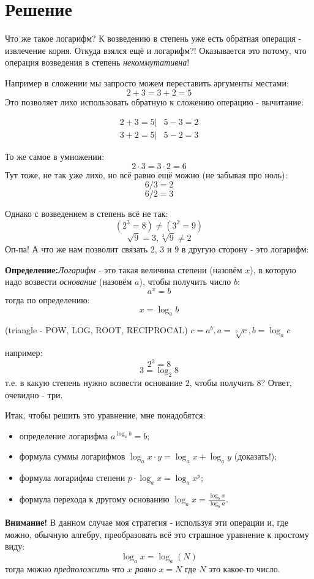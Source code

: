 \documentclass{article}
\begin{document}
\section{Решение}
Что же такое логарифм? К возведению в степень уже есть обратная операция - извлечение корня. Откуда взялся ещё и логарифм?! Оказывается это потому, что операция возведения в степень \textit{некоммутативна}!

Например в сложении мы запросто можем переставить аргументы местами:
$$2+3=3+2 = 5$$
Это позволяет лихо использовать обратную к сложению операцию - вычитание:


\begin{align*}
2+3=5 | & 5-3=2 \\
3+2=5 | & 5-2=3
\end{align*}

То же самое в умножении:
$$2\cdot{}3=3\cdot{}2=6$$
Тут тоже, не так уже лихо, но всё равно ещё можно (не забывая про ноль):
$$ 6/3=2 $$
$$ 6/2=3 $$

Однако с возведением в степень всё не так:
$$(2^3=8) \ne (3^2=9)$$
$$\sqrt{9}=3, \sqrt[3]{9} \ne 2$$
Оп-па! А что же нам позволит связать $2$, $3$ и $9$ в другую сторону - это логарифм:

\textbf{Определение:}\textit{Логарифм} - это такая величина степени (назовём $x$), в которую надо возвести \textit{основание} (назовём $a$), чтобы получить число $b$:
$$a^x=b$$
тогда по определению:
$$x=\log_{a}{b}$$

(triangle - POW, LOG, ROOT, RECIPROCAL)
$c=a^b, a=\sqrt[b]{c}, b=\log_a{c}$

например:
$$2^3=8$$
$$3=\log_{2}{8}$$
т.е. в какую степень нужно возвести основание $2$, чтобы получить $8$? Ответ, очевидно - три.

Итак, чтобы решить это уравнение, мне понадобятся:
\begin{itemize}
    \item определение логарифма $a^{\log_{a}{b}}=b$;
    \item формула суммы логарифмов $\log_{a}{x\cdot{}y}=\log_{a}{x}+\log_{a}{y}$ (доказать!);
    \item формула логарифма степени $p\cdot\log_{a}{x}=\log_{a}{x^p}$;
    \item формула перехода к другому основанию $\log_{a}{x}=\frac{\log_{b}{x}}{\log_{b}{a}}$.
\end{itemize}

\textbf{Внимание! } В данном случае моя стратегия - используя эти операции и, где можно, обычную алгебру, преобразовать всё это страшное уравнение к простому виду:
$$\log_{a}{x}=\log_{a}{(N)}$$
тогда можно \textit{предположить} что \textit{$x$ равно} $x=N$ где $N$ это какое-то число.
\end{document}
